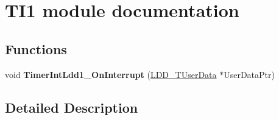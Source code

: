 \hypertarget{group___t_i1__module}{\section{T\-I1 module documentation}
\label{group___t_i1__module}
}
\subsection*{Functions}
\begin{DoxyCompactItemize}
\item 
\hypertarget{group___t_i1__module_ga54442f7694fc9c73818c8e5985597415}{void {\bfseries Timer\-Int\-Ldd1\-\_\-\-On\-Interrupt} (\hyperlink{group___p_e___types__module_ga0b66a73f87238a782318aa0be7578e35}{L\-D\-D\-\_\-\-T\-User\-Data} $\ast$User\-Data\-Ptr)}\label{group___t_i1__module_ga54442f7694fc9c73818c8e5985597415}

\end{DoxyCompactItemize}


\subsection{Detailed Description}
